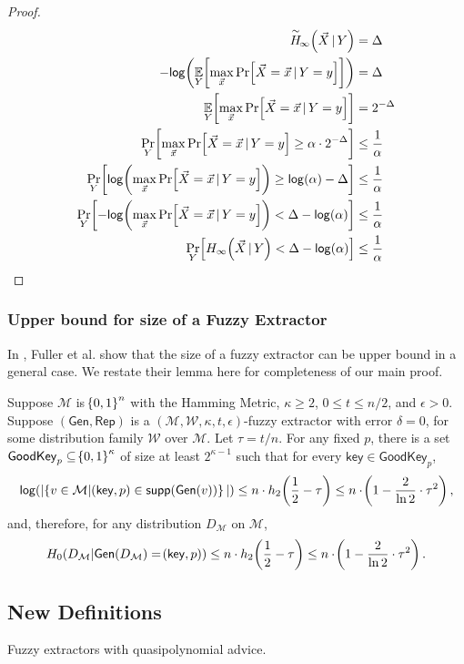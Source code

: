 \begin{proof} 

\begin{align}
    \acminent{\vec{X}}{Y} &= \Delta\\
    -\log{\Exlim{Y}{\max\limits_{\vec{x}} \Prob{\Vec{X} = \vec{x} \,|\, Y = y}}} &= \Delta\\
    \Exlim{Y}{\max\limits_{\vec{x}} \Prob{\Vec{X} = \vec{x} \,|\, Y = y}} &= 2^{-\Delta}\\
    \Problim{Y}{\max\limits_{\vec{x}} \Prob{\Vec{X} = \vec{x} \,|\, Y = y} \geq \alpha \cdot 2^{-\Delta}} &\leq \frac{1}{\alpha} \\
    \Problim{Y}{\log{\max\limits_{\vec{x}} \Prob{\Vec{X} = \vec{x} \,|\, Y = y}} \geq \log{\alpha} -\Delta} &\leq \frac{1}{\alpha} \\
    \Problim{Y}{-\log{\max\limits_{\vec{x}} \Prob{\Vec{X} = \vec{x} \,|\, Y = y}} < \Delta -\log{\alpha}} &\leq \frac{1}{\alpha} \\
    \Problim{Y}{\minent{\vec{X}\, |\, Y} < \Delta -\log{\alpha}} &\leq \frac{1}{\alpha}
\end{align}
    
\end{proof}

\subsubsection{Upper bound for size of a Fuzzy Extractor}
In \cite{fuller2020fuzzy}, Fuller et al. show that the size of a fuzzy extractor can be upper bound in a general case. 
We restate their lemma here for completeness of our main proof. 

\begin{lemma}
    \label{lem:smallgeneralviable}
    Suppose $\mathcal{M}$ is $\!\left\{ 0,1 \right\}^{n}$ with the Hamming Metric, $\kappa \geq 2$, $0 \leq t \leq n/2$, and $\epsilon > 0$. 
    Suppose $(\mathsf{Gen, Rep})$ is a $(\mathcal{M,W},\kappa, t, \epsilon)$-fuzzy extractor with error $\delta = 0$, for some distribution family $\mathcal{W}$ over $\mathcal{M}$. 
    Let $\tau = t/n$. 
    For any fixed $p$, there is a set $\mathsf{GoodKey}_p \subseteq \!\left\{ 0,1 \right\}^{\kappa}$ of size at least $2^{\kappa - 1}$ such that for every $\mathsf{key} \in \mathsf{GoodKey}_p$,
    \[
        \mathsf{log}\!\left(|\!\left\{ v \in \mathcal{M}|\!\left(\mathsf{key}, p\right) \in \mathsf{supp}\!\left(\mathsf{Gen}(v)\right) \right\}|\right) \leq n \cdot h_2\!\left(\frac{1}{2} - \tau\right) \leq n \cdot \!\left(1 - \frac{2}{\ln{2}} \cdot \tau^{2}\right), 
    \]   
    and, therefore, for any distribution $D_{\mathcal{M}}$ on $\mathcal{M}$, 
    \[
        H_0\!\left(D_{\mathcal{M}}|\mathsf{Gen}\!\left(D_{\mathcal{M}}\right) = \!\left(\mathsf{key}, p\right)\right) \leq n \cdot h_2\!\left(\frac{1}{2} - \tau\right) \leq n \cdot \!\left(1 - \frac{2}{\ln{2}} \cdot \tau^{2}\right).
    \]   
\end{lemma}

\subsection{New Definitions}
Fuzzy extractors with quasipolynomial advice. 